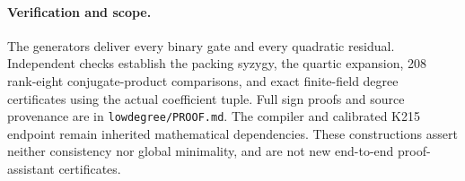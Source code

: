 \paragraph{Verification and scope.}
The generators deliver every binary gate and every quadratic residual.
Independent checks establish the packing syzygy, the quartic expansion,
208 rank-eight conjugate-product comparisons, and exact finite-field degree
certificates using the actual coefficient tuple. Full sign proofs and source
provenance are in \texttt{lowdegree/PROOF.md}. The compiler and calibrated
K215 endpoint remain inherited mathematical dependencies. These constructions
assert neither consistency nor global minimality, and are not new end-to-end
proof-assistant certificates.
